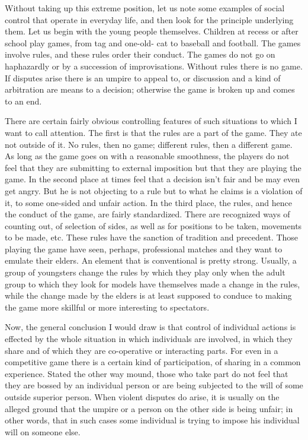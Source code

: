 Without taking up this extreme position, let us note some examples of social control 
that operate in everyday life, and then look for the principle underlying them. Let us 
begin with the young people themselves. Children at recess or after school play games, from tag and one-old- cat to baseball and football. The games involve rules, and these 
rules order their conduct. The games do not go on haphazardly or by a succession of 
improvisations. Without rules there is no game. If disputes arise there is an umpire to 
appeal to, or discussion and a kind of arbitration are means to a decision; otherwise the 
game is broken up and comes to an end. 

There are certain fairly obvious controlling features of such situations to which I want 
to call attention. The first is that the rules are a part of the game. They ate not outside of 
it. No rules, then no game; different rules, then a different game. As long as the game 
goes on with a reasonable smoothness, the players do not feel that they are submitting to 
external imposition but that they are playing the game. In the second place at times feel 
that a decision isn't fair and be may even get angry. But he is not objecting to a rule but to 
what he claims is a violation of it, to some one-sided and unfair action. In the third place, 
the rules, and hence the conduct of the game, are fairly standardized. There are 
recognized ways of counting out, of selection of sides, as well as for positions to be 
taken, movements to be made, etc. These rules have the sanction of tradition and 
precedent. Those playing the game have seen, perhaps, professional matches and they 
want to emulate their elders. An element that is conventional is pretty strong. Usually, a 
group of youngsters change the rules by which they play only when the adult group to 
which they look for models have themselves made a change in the rules, while the change 
made by the elders is at least supposed to conduce to making the game more skillful or 
more interesting to spectators. 

Now, the general conclusion I would draw is that control of individual actions is 
effected by the whole situation in which individuals are involved, in which they share and 
of which they are co-operative or interacting parts. For even in a competitive game there 
is a certain kind of participation, of sharing in a common experience. Stated the other 
way mound, those who take part do not feel that they are bossed by an individual person 
or are being subjected to the will of some outside superior person. When violent disputes 
do arise, it is usually on the alleged ground that the umpire or a person on the other side is 
being unfair; in other words, that in such cases some individual is trying to impose his 
individual will on someone else. 


